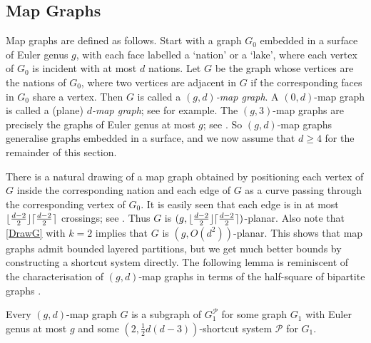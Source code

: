 \documentclass{patmorin}
\DeclarePairedDelimiter{\ceil}{\lceil}{\rceil}
\DeclarePairedDelimiter{\floor}{\lfloor}{\rfloor}
\newcommand{\PP}{\mathcal{P}}
\renewcommand{\geq}{\geqslant}
\begin{document}
\subsection{Map Graphs}

Map graphs are defined as follows. Start with a graph $G_0$ embedded in a surface of Euler genus $g$, with each face labelled a `nation' or a `lake', where each vertex of $G_0$ is incident with at most $d$ nations. Let $G$ be the graph whose vertices are the nations of $G_0$, where two vertices are adjacent in $G$ if the corresponding faces in $G_0$ share a vertex. Then $G$ is called a \emph{$(g,d)$-map graph}.  A $(0,d)$-map graph is called a (plane) \emph{$d$-map graph}; see \citep{FLS-SODA12,CGP02} for example. 
The $(g,3)$-map graphs are precisely the graphs of Euler genus at most $g$; see \citep{dujmovic.eppstein.ea:structure}. So $(g,d)$-map graphs generalise graphs embedded in a surface, and we now assume that $d\geq 4$ for the remainder of this section. 

There is a natural drawing of a map graph obtained by positioning each vertex of $G$ inside the corresponding nation and each edge of $G$ as a curve passing through the corresponding vertex of $G_0$. It is easily seen that each edge is in at most $\floor{\frac{d-2}{2}}\ceil{\frac{d-2}{2}}$ crossings; see \citep{dujmovic.eppstein.ea:structure}. Thus $G$ is $(g,\floor{\frac{d-2}{2}}\ceil{\frac{d-2}{2}})$-planar. Also note that \cref{DrawG} with $k=2$ implies that $G$ is $(g, O(d^{2}) )$-planar. This shows that map graphs admit bounded layered partitions, but we get much better bounds by constructing a shortcut system directly.  The following lemma is reminiscent of the characterisation of $(g,d)$-map graphs in terms of the half-square of bipartite graphs \citep{CGP02,dujmovic.eppstein.ea:structure}. 


\begin{lem}
\label{MapShortcut}
Every $(g,d)$-map graph $G$ is a subgraph of $G_1^\PP$ for some graph $G_1$ with Euler genus at most $g$ and some $(2,\tfrac12 d(d-3) )$-shortcut system $\PP$ for $G_1$. 
\end{lem}
\end{document}
